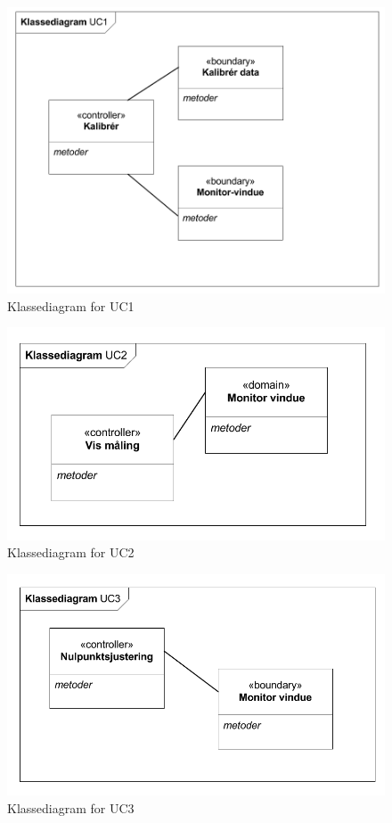 \begin{figure}[H]
	\centering
	\includegraphics[width=1\textwidth]{Figurer/Snip20151102_15}
	\caption{Klassediagram for UC1}
\end{figure}

\begin{figure}[H]
	\centering
	\includegraphics[width=1\textwidth]{Figurer/Snip20151102_16}
	\caption{Klassediagram for UC2}
\end{figure}

\begin{figure}[H]
	\centering
	\includegraphics[width=1\textwidth]{Figurer/Snip20151102_17}
	\caption{Klassediagram for UC3}
\end{figure}

